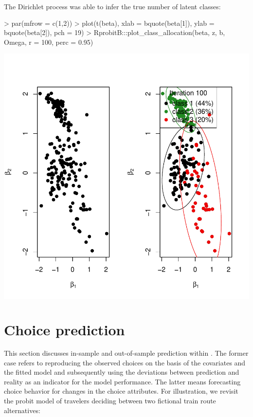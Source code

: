 \documentclass[article]{jss}
\begin{document}
\begin{Schunk}
\end{Schunk}

The Dirichlet process was able to infer the true number  of latent classes:

\begin{Schunk}
\begin{Sinput}
> par(mfrow = c(1,2))
> plot(t(beta), xlab = bquote(beta[1]), ylab = bquote(beta[2]), pch = 19)
> RprobitB:::plot_class_allocation(beta, z, b, Omega, r = 100, perc = 0.95)
\end{Sinput}
\end{Schunk}
\includegraphics{rprobitb_oelschlaeger_bauer-dirichlet-example-plot}

\section{Choice prediction} \label{sec:choice_prediction}

This section discusses in-sample and out-of-sample prediction within . The former case refers to reproducing the observed choices on the basis of the covariates and the fitted model and subsequently using the deviations between prediction and reality as an indicator for the model performance. The latter means forecasting choice behavior for changes in the choice attributes. For illustration, we revisit the probit model of travelers deciding between two fictional train route alternatives:
\end{document}
